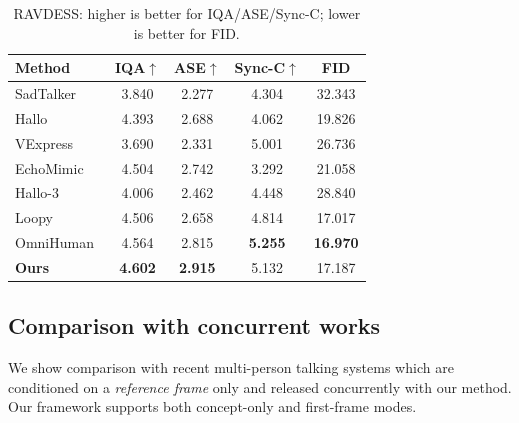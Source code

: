 \documentclass{article} %
\begin{document}
\begin{table}[h]
\centering
\caption{RAVDESS: higher is better for IQA/ASE/Sync-C; lower is better for FID.}
\label{tab:ravdess_table}
\begin{tabular}{lcccc}
\toprule
Method & IQA$\uparrow$ & ASE$\uparrow$ & Sync-C$\uparrow$ & FID \\
\midrule
SadTalker~\citep{zhang2023sadtalker} & 3.840 & 2.277 & 4.304 & 32.343 \\
Hallo~\citep{xu2024hallo} & 4.393 & 2.688 & 4.062 & 19.826 \\
VExpress~\citep{wang2024vexpress} & 3.690 & 2.331 & 5.001 & 26.736 \\
EchoMimic~\citep{chen2024echomimic} & 4.504 & 2.742 & 3.292 & 21.058 \\
Hallo-3~\citep{hallo3} & 4.006 & 2.462 & 4.448 & 28.840 \\
Loopy~\citep{jiang2024loopy} & 4.506 & 2.658 & 4.814 & 17.017 \\
OmniHuman~\citep{lin2025omnihuman} & 4.564 & 2.815 & \textbf{5.255} & \textbf{16.970} \\ \midrule
\textbf{Ours} & \textbf{4.602} & \textbf{2.915} & 5.132 & 17.187 \\
\bottomrule
\end{tabular}
\end{table}


\subsection{Comparison with concurrent works}
\label{app:capability}
We show comparison with recent multi-person talking systems which are conditioned on a \emph{reference frame} only and released concurrently with our method. Our framework supports both concept-only and first-frame modes.
\end{document}
